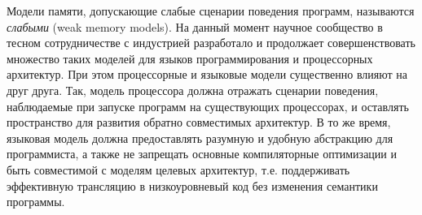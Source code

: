 Модели памяти, допускающие слабые сценарии поведения программ, называются \emph{слабыми}
(weak memory models).
На данный момент научное сообщество в тесном сотрудничестве с индустрией
разработало и продолжает совершенствовать множество таких моделей для
языков программирования и процессорных архитектур.
При этом процессорные и языковые модели существенно влияют на друг друга.
Так, модель процессора должна отражать сценарии поведения, наблюдаемые при запуске программ
на существующих процессорах, и оставлять пространство для развития
обратно совместимых архитектур. В то же время, языковая модель должна
предоставлять разумную и удобную абстракцию для программиста, а также не запрещать основные
компиляторные оптимизации и быть совместимой с моделям целевых архитектур,
т.е. поддерживать эффективную трансляцию в низкоуровневый код без изменения
семантики программы.



